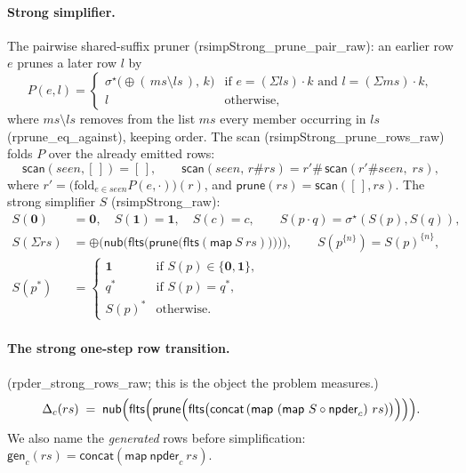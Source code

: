 \documentclass[11pt]{article}
\theoremstyle{remark}
\newcommand{\ZERO}{\mathbf{0}}
\newcommand{\ONE}{\mathbf{1}}
\newcommand{\nub}{\mathsf{nub}}
\newcommand{\flts}{\mathsf{flts}}
\newcommand{\altsmart}{\oplus}
\newcommand{\seqstar}{\sigma^{\star}}
\newcommand{\npder}{\mathsf{npder}}
\newcommand{\Sstrong}{S}
\newcommand{\Dstep}{\Delta}
\newcommand{\gen}{\mathsf{gen}}
\newcommand{\thy}[1]{\textsf{\small #1}}
\begin{document}
\paragraph{Strong simplifier.}
The pairwise shared-suffix pruner (\thy{rsimpStrong\_prune\_pair\_raw}): an
earlier row $e$ prunes a later row $l$ by
\[
P(e,l)=
\begin{cases}
\seqstar\bigl(\altsmart(\,ms\setminus ls\,),\,k\bigr)
  & \text{if } e=(\Sigma ls)\cdot k \text{ and } l=(\Sigma ms)\cdot k,\\
l & \text{otherwise},
\end{cases}
\]
where $ms\setminus ls$ removes from the list $ms$ every member occurring in
$ls$ (\thy{rprune\_eq\_against}), keeping order.
The scan (\thy{rsimpStrong\_prune\_rows\_raw}) folds $P$ over the already
emitted rows:
\[
\mathsf{scan}(seen,[\,])=[\,],\qquad
\mathsf{scan}(seen,\,r\#rs)=r'\#\,\mathsf{scan}(r'\#seen,\;rs),
\]
where $r'=\bigl(\mathrm{fold}_{e\in seen}P(e,\cdot)\bigr)(r)$, and
$\mathsf{prune}(rs)=\mathsf{scan}([\,],rs)$.
The strong simplifier $\Sstrong$ (\thy{rsimpStrong\_raw}):
\[
\begin{aligned}
\Sstrong(\ZERO)&=\ZERO,\quad \Sstrong(\ONE)=\ONE,\quad \Sstrong(c)=c,\qquad
\Sstrong(p\cdot q)=\seqstar(\Sstrong(p),\Sstrong(q)),\\
\Sstrong(\Sigma rs)&=\altsmart\bigl(\nub\bigl(\flts\bigl(\mathsf{prune}
  \bigl(\flts(\mathsf{map}\ \Sstrong\ rs)\bigr)\bigr)\bigr)\bigr),\qquad
\Sstrong(p^{\{n\}})=\Sstrong(p)^{\{n\}},\\
\Sstrong(p^{*})&=
\begin{cases}
\ONE & \text{if }\Sstrong(p)\in\{\ZERO,\ONE\},\\
q^{*} & \text{if }\Sstrong(p)=q^{*},\\
\Sstrong(p)^{*} & \text{otherwise}.
\end{cases}
\end{aligned}
\]

\paragraph{The strong one-step row transition.}
(\thy{rpder\_strong\_rows\_raw}; this is the object the problem measures.)
\[
\Dstep_c(rs)\;=\;\nub\Bigl(\flts\Bigl(\mathsf{prune}\Bigl(\flts\bigl(
  \mathsf{concat}\,(\mathsf{map}\ (\mathsf{map}\ \Sstrong\circ\npder_c)\ rs)
  \bigr)\Bigr)\Bigr)\Bigr).
\]
We also name the \emph{generated} rows before simplification:
$\gen_c(rs)=\mathsf{concat}(\mathsf{map}\ \npder_c\ rs)$.
\end{document}
